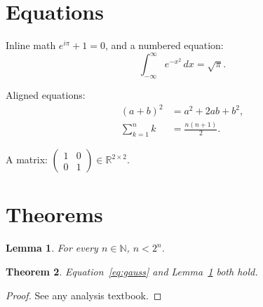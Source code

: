 \documentclass{article}
\newtheorem{theorem}{Theorem}
\newtheorem{lemma}[theorem]{Lemma}
\begin{document}
\section{Equations}

Inline math $e^{i\pi} + 1 = 0$, and a numbered equation:
\begin{equation}
  \int_{-\infty}^{\infty} e^{-x^2}\,dx = \sqrt{\pi}.
  \label{eq:gauss}
\end{equation}

Aligned equations:
\begin{align}
  (a+b)^2 &= a^2 + 2ab + b^2, \\
  \sum_{k=1}^{n} k &= \frac{n(n+1)}{2}.
\end{align}

A matrix: $\begin{pmatrix} 1 & 0 \\ 0 & 1 \end{pmatrix} \in \mathbb{R}^{2\times 2}$.

\section{Theorems}

\begin{lemma}\label{lem:small}
For every $n \in \mathbb{N}$, $n < 2^n$.
\end{lemma}

\begin{theorem}
Equation~\eqref{eq:gauss} and Lemma~\ref{lem:small} both hold.
\end{theorem}

\begin{proof}
See any analysis textbook.
\end{proof}
\end{document}
